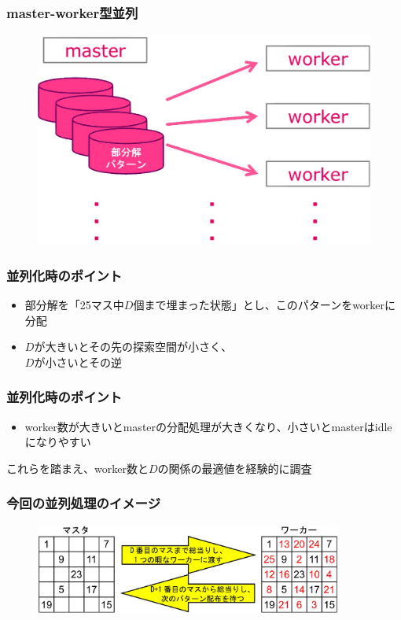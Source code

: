 \documentclass[dvipdfmx,20pt,notheorems,t]{beamer}
\begin{document}
\begin{frame}\frametitle{master-worker型並列}
\begin{figure}[htb]
\centering
\includegraphics[height=0.7\textheight]{real-master-worker.eps}
\end{figure}
\end{frame}

\begin{frame}\frametitle{並列化時のポイント}
\begin{itemize}
\item 部分解を「25マス中$D$個まで埋まった状態」とし、このパターンをworkerに分配
\item $D$が大きいとその先の探索空間が小さく、\\ $D$が小さいとその逆
\end{itemize}
\end{frame}

\begin{frame}\frametitle{並列化時のポイント}
\begin{itemize}
\item worker数が大きいとmasterの分配処理が大きくなり、小さいとmasterはidleになりやすい
\end{itemize}
これらを踏まえ、worker数と$D$の関係の最適値を経験的に調査
\end{frame}

\begin{frame}\frametitle{今回の並列処理のイメージ}
\begin{figure}[htb]
\centering
\includegraphics[width=0.9\textwidth]{master-worker-proc.eps}
\end{figure}
\end{frame}
\end{document}
